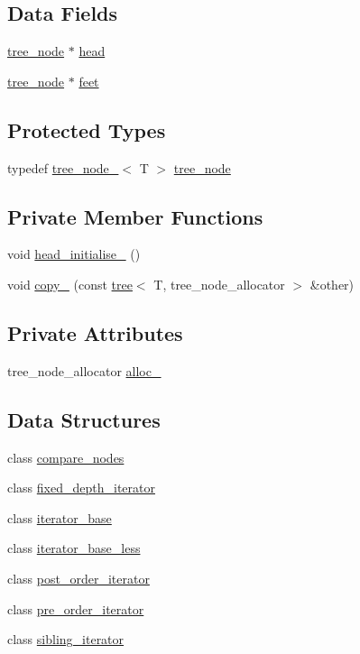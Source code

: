 \subsection*{Data Fields}
\begin{CompactItemize}
\item 
\hyperlink{classtree__node__}{tree\_\-node} $\ast$ \hyperlink{classtree_10991cbf1497e125c0ef04d6e292e32b}{head}
\item 
\hyperlink{classtree__node__}{tree\_\-node} $\ast$ \hyperlink{classtree_e1dbb80115ba483e37d081a2256c239b}{feet}
\end{CompactItemize}
\subsection*{Protected Types}
\begin{CompactItemize}
\item 
typedef \hyperlink{classtree__node__}{tree\_\-node\_\-}$<$ T $>$ \hyperlink{classtree_672d078d87ae97c58b732a940d7b8ca8}{tree\_\-node}
\end{CompactItemize}
\subsection*{Private Member Functions}
\begin{CompactItemize}
\item 
void \hyperlink{classtree_5840b048b937d8f4f1d55c4aef948a58}{head\_\-initialise\_\-} ()
\item 
void \hyperlink{classtree_35df9f0f8fef4c86ef70cad0027b7454}{copy\_\-} (const \hyperlink{classtree}{tree}$<$ T, tree\_\-node\_\-allocator $>$ \&other)
\end{CompactItemize}
\subsection*{Private Attributes}
\begin{CompactItemize}
\item 
tree\_\-node\_\-allocator \hyperlink{classtree_6bc0fbe7b7be665799592b513d307f17}{alloc\_\-}
\end{CompactItemize}
\subsection*{Data Structures}
\begin{CompactItemize}
\item 
class \hyperlink{classtree_1_1compare__nodes}{compare\_\-nodes}
\item 
class \hyperlink{classtree_1_1fixed__depth__iterator}{fixed\_\-depth\_\-iterator}
\item 
class \hyperlink{classtree_1_1iterator__base}{iterator\_\-base}
\item 
class \hyperlink{classtree_1_1iterator__base__less}{iterator\_\-base\_\-less}
\item 
class \hyperlink{classtree_1_1post__order__iterator}{post\_\-order\_\-iterator}
\item 
class \hyperlink{classtree_1_1pre__order__iterator}{pre\_\-order\_\-iterator}
\item 
class \hyperlink{classtree_1_1sibling__iterator}{sibling\_\-iterator}
\end{CompactItemize}

